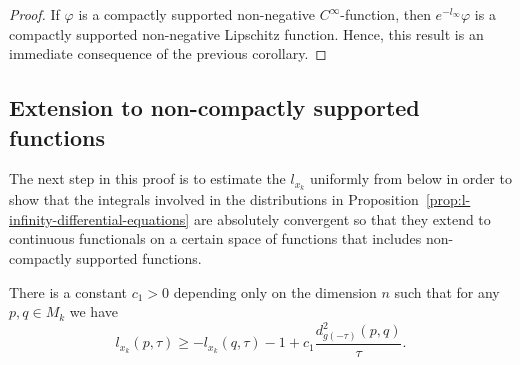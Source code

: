\begin{proof}
If $\varphi$ is a compactly supported non-negative
$C^\infty$-function, then $e^{-l_\infty}\varphi$ is a compactly
supported non-negative Lipschitz function. Hence, this result is an
immediate consequence of the previous corollary.
\end{proof}

\subsection{Extension to non-compactly supported functions}

The next step in this proof is to estimate the $l_{x_k}$ uniformly from below
in order to show that  the integrals involved in the distributions in
Proposition~\ref{prop:l-infinity-differential-equations} are absolutely convergent so that they extend to
continuous functionals on a certain  space of functions that includes
non-compactly supported functions.

\begin{lemma}\label{lem:l-function-lower-bound}
\label{lowerbdd}
There is a constant $c_1>0$ depending only on the dimension $n$ such
that for any $p,q\in M_k$ we have
$$l_{x_k}(p,\tau)\ge -l_{x_k}(q,\tau)-1+c_1\frac{d^2_{g(-\tau)}(p,q)}{\tau}.$$
\end{lemma}

